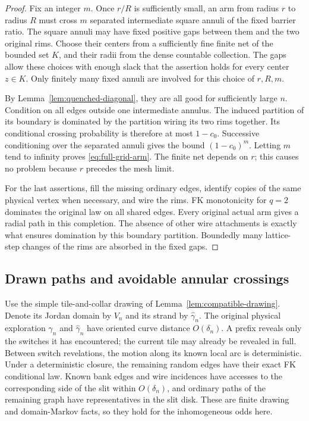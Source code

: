 \begin{proof}
Fix an integer $m$.  Once $r/R$ is sufficiently small, an arm from
radius $r$ to radius $R$ must cross $m$ separated intermediate square
annuli of the fixed barrier ratio.  The square annuli may have fixed
positive gaps between them and the two original rims.  Choose their
centers from a sufficiently fine finite net of the bounded set $K$,
and their radii from the dense countable collection.  The gaps allow
these choices with enough slack that the assertion holds for every
center $z\in K$.  Only finitely many fixed annuli are involved for
this choice of $r,R,m$.

By Lemma~\ref{lem:quenched-diagonal}, they are all good for sufficiently
large $n$.  Condition on all edges outside one intermediate annulus.
The induced partition of its boundary is dominated by the partition
wiring its two rims together.  Its conditional crossing probability
is therefore at most $1-c_0$.  Successive conditioning over the
separated annuli gives the bound $(1-c_0)^m$.  Letting $m$ tend to
infinity proves \eqref{eq:full-grid-arm}.  The finite net depends on
$r$; this causes no problem because $r$ precedes the mesh limit.

For the last assertions, fill the missing ordinary edges, identify
copies of the same physical vertex when necessary, and wire the
rims.  FK monotonicity for $q=2$ dominates the original law on all
shared edges.  Every original actual arm gives a radial path in this
completion.  The absence of other wire attachments is exactly what
ensures domination by this boundary partition.  Boundedly many
lattice-step changes of the rims are absorbed in the fixed gaps.
\end{proof}

\subsection{Drawn paths and avoidable annular crossings}

Use the simple tile-and-collar drawing of
Lemma~\ref{lem:compatible-drawing}.  Denote its Jordan domain by $V_n$
and its strand by $\widehat\gamma_n$.  The original physical
exploration $\gamma_n$ and $\widehat\gamma_n$ have oriented curve
distance $O(\delta_n)$.  A prefix reveals only the switches it has
encountered; the current tile may already be revealed in full.
Between switch revelations, the motion along its known local arc is
deterministic.  Under a deterministic closure, the remaining random
edges have their exact FK conditional law.  Known bank edges and
wire incidences have accesses to the corresponding side of the slit
within $O(\delta_n)$, and ordinary paths of the remaining graph have
representatives in the slit disk.  These are finite drawing and
domain-Markov facts, so they hold for the inhomogeneous odds here.

